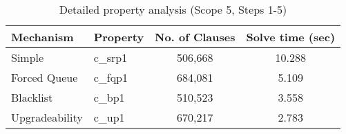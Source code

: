 \begin{table}[htbp]
\centering
\begin{tabular}{|l|l|c|c|}
\hline
\textbf{Mechanism} & \textbf{Property} & \textbf{No. of Clauses} & \textbf{Solve time (sec)} \\
\hline
Simple & c_srp1 & 506,668 & 10.288 \\
Forced Queue & c_fqp1 & 684,081 & 5.109 \\
Blacklist & c_bp1 & 510,523 & 3.558 \\
Upgradeability & c_up1 & 670,217 & 2.783 \\
\hline
\end{tabular}
\caption{Detailed property analysis (Scope 5, Steps 1-5)}
\label{tab:detailed_properties_steps_5}
\end{table}